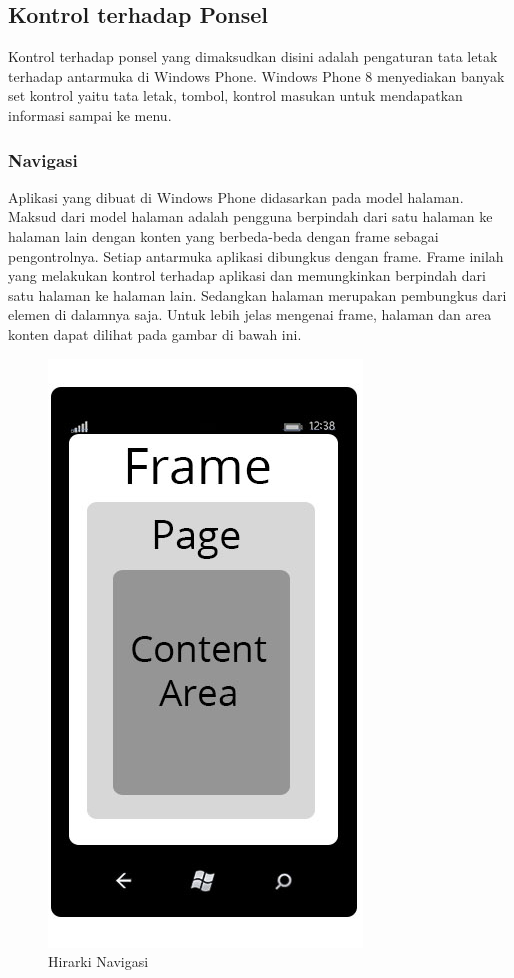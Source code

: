 \subsection{Kontrol terhadap Ponsel}
\label{subsec:Kontrol terhadap Ponsel}
\hspace{0.5cm} Kontrol terhadap ponsel yang dimaksudkan disini adalah pengaturan tata letak terhadap antarmuka di Windows Phone. Windows Phone 8 menyediakan banyak set kontrol yaitu tata letak, tombol, kontrol masukan untuk mendapatkan informasi sampai ke menu. 

\subsubsection{Navigasi}
\label{subsubsec:Navigasi}
\hspace{0.5cm} Aplikasi yang dibuat di Windows Phone didasarkan pada model halaman. Maksud dari model halaman adalah pengguna berpindah dari satu halaman ke halaman lain dengan konten yang berbeda-beda dengan frame sebagai pengontrolnya. Setiap antarmuka aplikasi dibungkus dengan frame. Frame inilah yang melakukan kontrol terhadap aplikasi dan memungkinkan berpindah dari satu halaman ke halaman lain. Sedangkan halaman merupakan pembungkus dari elemen di dalamnya saja. Untuk lebih jelas mengenai frame, halaman dan area konten dapat dilihat pada gambar di bawah ini.

\begin{figure}[h]
	\centering
		\includegraphics[scale=0.5]{Gambar/nav_hierarchy}
	\caption{Hirarki Navigasi}
	\label{fig:nav_hierarchy}
\end{figure}


